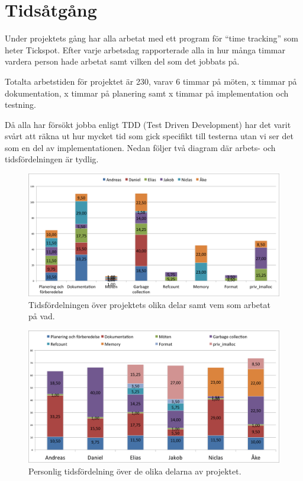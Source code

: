 \documentclass{article}
\begin{document}
\section{Tidsåtgång}

Under projektets gång har alla arbetat med ett program för “time tracking” som heter Tickspot. Efter varje arbetsdag rapporterade alla in hur många timmar vardera person hade arbetat samt vilken del som det jobbats på.

Totalta arbetstiden för projektet är 230, varav 6 timmar på möten, x timmar på dokumentation, x timmar på planering samt x timmar på implementation och testning.

Då alla har försökt jobba enligt TDD (Test Driven Development) har det varit svårt att räkna ut hur mycket tid som gick specifikt till testerna utan vi ser det som en del av implementationen. Nedan följer två diagram där arbets- och tidsfördelningen är tydlig.

\begin{figure}[H]
  \includegraphics[width=\columnwidth]{images/chart_parts.png}
  \caption{Tidsfördelningen över projektets olika delar 
    samt vem som arbetat på vad.}
  \label{fig:chart_parts}
\end{figure}

\begin{figure}[H]
  \includegraphics[width=\columnwidth]{images/chart_people.png}
  \caption{Personlig tidsfördelning över de olika delarna av projektet.}
  \label{fig:chart_people}
\end{figure}
\end{document}
